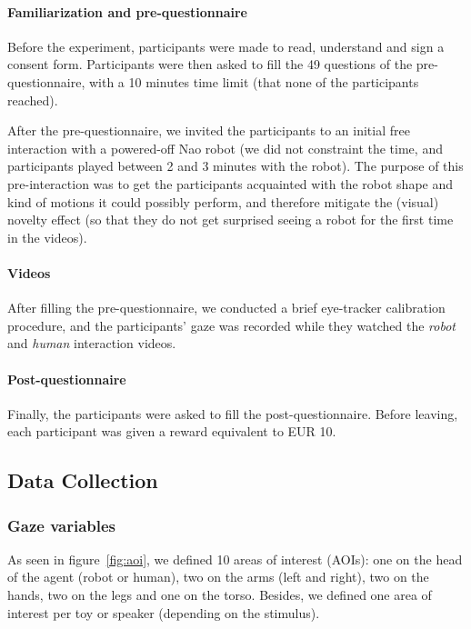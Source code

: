 \documentclass[lettersize, noapacite, twoside, HRI]{apa_HRI}
\begin{document}
\paragraph{Familiarization and pre-questionnaire}

Before the experiment, participants were made to read, understand and sign a
consent form. Participants were then asked to fill the 49 questions of
the pre-questionnaire, with a 10 minutes time limit (that none of the participants
reached).

After the pre-questionnaire, we invited the participants to an initial
free interaction with a powered-off Nao robot (we did not constraint
the time, and participants played between 2 and 3 minutes with the robot).
The purpose of this pre-interaction was to get the participants acquainted with the
robot shape and kind of motions it could possibly perform, and therefore
mitigate the (visual) novelty effect (so that they do not get surprised seeing
a robot for the first time in the videos).

\paragraph{Videos}

After filling the pre-questionnaire, we conducted a brief eye-tracker
calibration procedure, and the participants' gaze was recorded while they
watched the \emph{robot} and \emph{human} interaction videos.

\paragraph{Post-questionnaire}

Finally, the participants were asked to fill the post-questionnaire.
Before leaving, each participant was given a reward
equivalent to EUR 10.

\subsection{Data Collection}

\subsubsection{Gaze variables}

As seen in figure~\ref{fig:aoi}, we defined 10 areas of interest (AOIs): one on
the head of the agent (robot or human), two on the arms (left and right), two on
the hands, two on the legs and one on the torso. Besides, we defined one area of
interest per toy or speaker (depending on the stimulus).
\end{document}
